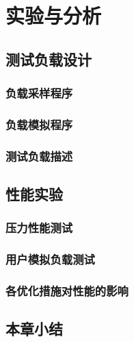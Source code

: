 
\chapter{实验与分析\label{sec:chap8}}
\section{测试负载设计}
\subsection{负载采样程序}
\subsection{负载模拟程序}
\subsection{测试负载描述}
\section{性能实验}
\subsection{压力性能测试}
\subsection{用户模拟负载测试}
\subsection{各优化措施对性能的影响}
\section{本章小结}